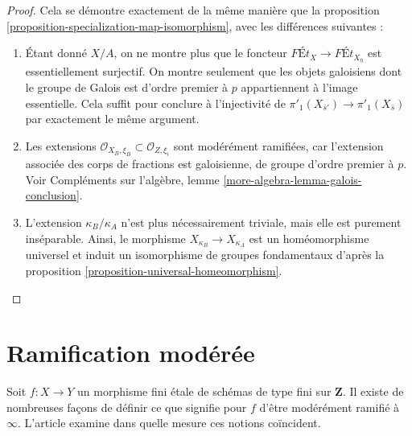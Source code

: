 \begin{proof}
Cela se démontre exactement de la même manière que la
proposition \ref{proposition-specialization-map-isomorphism},
avec les différences suivantes :
\begin{enumerate}
\item Étant donné $X/A$, on ne montre plus que le foncteur
$\textit{F\'Et}_X \to \textit{F\'Et}_{X_{\overline{\eta}}}$
est essentiellement surjectif. On montre seulement que les objets galoisiens
dont le groupe de Galois est d'ordre premier à $p$ appartiennent à l'image
essentielle. Cela suffit pour conclure à l'injectivité de
$\pi'_1(X_{\overline{s}'}) \to \pi'_1(X_{\overline{s}})$ par
exactement le même argument.
\item Les extensions
$\mathcal{O}_{X_B, \xi_B} \subset \mathcal{O}_{Z, \xi_i}$
sont modérément ramifiées, car l'extension associée des corps de
fractions est galoisienne, de groupe d'ordre premier à $p$. Voir
Compléments sur l'algèbre, lemme \ref{more-algebra-lemma-galois-conclusion}.
\item L'extension $\kappa_B/\kappa_A$ n'est plus
nécessairement triviale, mais elle est purement inséparable.
Ainsi, le morphisme $X_{\kappa_B} \to X_{\kappa_A}$
est un homéomorphisme universel et induit un isomorphisme
de groupes fondamentaux d'après la proposition \ref{proposition-universal-homeomorphism}.
\end{enumerate}
\end{proof}













\section{Ramification modérée}
\label{section-tame}

\noindent
Soit $f : X \to Y$ un morphisme fini \'etale de schémas de type fini
sur $\mathbf{Z}$. Il existe de nombreuses façons de définir ce que signifie pour $f$
d'être modérément ramifié à $\infty$. L'article \cite{Kerz-Schmidt}
examine dans quelle mesure ces notions coïncident.

